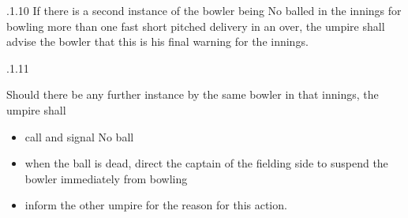 \documentclass[12pt]{article}
\begin{document}
\vspace{\baselineskip}

\vspace{\baselineskip}

\vspace{\baselineskip}

\vspace{\baselineskip}

\vspace{\baselineskip}
\begin{Center}
{\fontsize{8pt}{9.6pt}\par}
\end{Center}\par


\vspace{\baselineskip}

\vspace{\baselineskip}
\begin{adjustwidth}{1.18in}{0.06in}
\begin{justify}
{\fontsize{9pt}{10.8pt}.1.10 \tabto{1.17in} If there is a second instance of the bowler being No balled in the innings for bowling more than one fast short pitched delivery in an over, the umpire shall advise the bowler that this is his final warning for the innings.\par}
\end{justify}\par

\end{adjustwidth}


\vspace{\baselineskip}
\begin{adjustwidth}{0.49in}{0.0in}
{\fontsize{9pt}{10.8pt}.1.11 \tabto{1.17in} {\fontsize{8pt}{9.6pt}\selectfont Should there be any further instance by the same bowler in that innings, the umpire shall\par}\par}\par

\end{adjustwidth}


\vspace{\baselineskip}
\begin{itemize}
	\item {\fontsize{9pt}{10.8pt}\selectfont call and signal No ball\par}\par


\vspace{\baselineskip}
	\item {\fontsize{9pt}{10.8pt}\selectfont when the ball is dead, direct the captain of the fielding side to suspend the bowler immediately from bowling\par}\par


\vspace{\baselineskip}
	\item {\fontsize{9pt}{10.8pt}\selectfont inform the other umpire for the reason for this action.\par}
\end{itemize}\par
\end{document}
